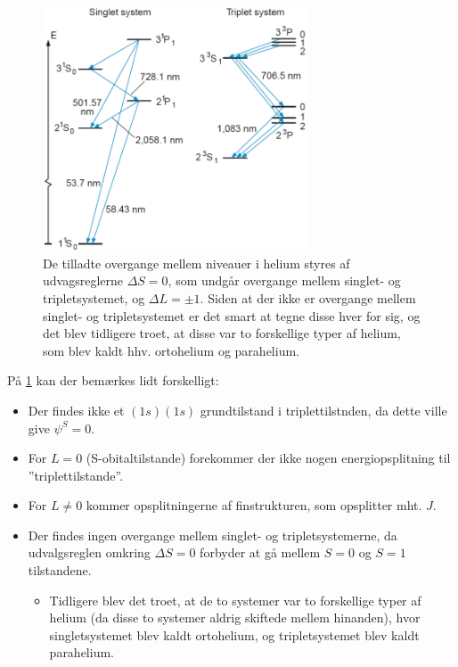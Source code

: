 \begin{figure}[!h]
    \centering
    \includegraphics[width=0.7\textwidth]{Q11/images/SingletOgtripletTilstandeIHelium.PNG}
    \caption{De tilladte overgange mellem niveauer i helium styres af udvagsreglerne $\Delta S = 0$, som undgår overgange mellem singlet- og tripletsystemet, og $\Delta L = \pm 1$. Siden at der ikke er overgange mellem singlet- og tripletsystemet er det smart at tegne disse hver for sig, og det blev tidligere troet, at disse var to forskellige typer af helium, som blev kaldt hhv. ortohelium og parahelium.}
    \label{fig:Q11_SingletOgTripletTilstandeIHelium}
\end{figure}

På \cref{fig:Q11_SingletOgTripletTilstandeIHelium} kan der bemærkes lidt forskelligt:
\begin{itemize}
    \item Der findes ikke et $(1s)(1s)$ grundtilstand i triplettilstnden, da dette ville give $\psi^S = 0$.
    \item For $L = 0$ (S-obitaltilstande) forekommer der ikke nogen energiopsplitning til ''triplettilstande''.
    \item For $L \ne 0$ kommer opsplitningerne af finstrukturen, som opsplitter mht. $J$.
    \item Der findes ingen overgange mellem singlet- og tripletsystemerne, da udvalgsreglen omkring $\Delta S = 0$ forbyder at gå mellem $S = 0$ og $S = 1$ tilstandene.
    \begin{itemize}
        \item Tidligere blev det troet, at de to systemer var to forskellige typer af helium (da disse to systemer aldrig skiftede mellem hinanden), hvor singletsystemet blev kaldt \textsf{ortohelium}, og tripletsystemet blev kaldt \textsf{parahelium}.
    \end{itemize}
\end{itemize}